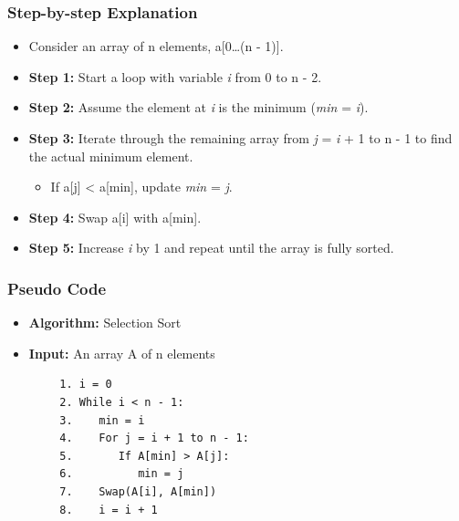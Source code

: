     \subsubsection{Step-by-step Explanation}
        \begin{itemize}
            \item Consider an array of n elements, a[0\ldots (n - 1)].
            \item \textbf{Step 1:} Start a loop with variable \textit{i} from 0 to n - 2.
            \item \textbf{Step 2:} Assume the element at \textit{i} is the minimum (\textit{min} = \textit{i}).
            \item \textbf{Step 3:} Iterate through the remaining array from \textit{j} = \textit{i} + 1 to n - 1 to find the actual minimum element.
            \begin{itemize}
                \item If a[j] < a[min], update \textit{min} = \textit{j}.
            \end{itemize}
            \item \textbf{Step 4:} Swap a[i] with a[min].
            \item \textbf{Step 5:} Increase \textit{i} by 1 and repeat until the array is fully sorted.
        \end{itemize}

    \subsubsection{Pseudo Code}
        \begin{itemize}
            \item \textbf{Algorithm:} Selection Sort
            \item \textbf{Input:} An array A of n elements
        \end{itemize}
        \begin{verbatim}
        1. i = 0
        2. While i < n - 1:
        3.    min = i
        4.    For j = i + 1 to n - 1:
        5.       If A[min] > A[j]:
        6.          min = j
        7.    Swap(A[i], A[min])
        8.    i = i + 1
        \end{verbatim}
